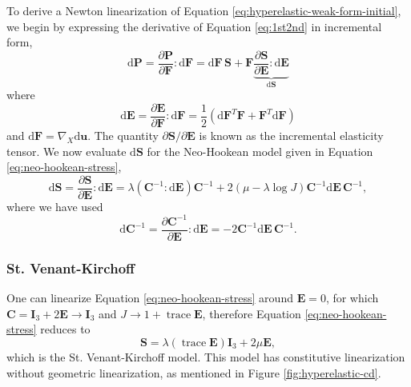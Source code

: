 To derive a Newton linearization of Equation \ref{eq:hyperelastic-weak-form-initial}, we begin by expressing the derivative of Equation \ref{eq:1st2nd} in incremental form,
\begin{equation}
   \text{d} \mathbf P = \frac{\partial \mathbf P}{\partial \mathbf F} \!:\! \text{d} \mathbf F = \text{d} \mathbf F\, \mathbf S + \mathbf F \underbrace{\frac{\partial \mathbf S}{\partial \mathbf E} \!:\! \text{d} \mathbf E}_{\text{d} \mathbf S}
   \label{eq:diff-P}
\end{equation}
where
\begin{equation}
   \text{d} \mathbf E = \frac{\partial \mathbf E}{\partial \mathbf F} \!:\! \text{d} \mathbf F = \frac 1 2 \left( \text{d} \mathbf F^T \mathbf F + \mathbf F^T \text{d} \mathbf F \right)
\end{equation}
and $\text{d}\mathbf F = \nabla_X\text{d}\mathbf u$.
The quantity ${\partial \mathbf S} / {\partial \mathbf E}$ is known as the incremental elasticity tensor.
We now evaluate $\text{d} \mathbf S$ for the Neo-Hookean model given in Equation \ref{eq:neo-hookean-stress},
\begin{equation}
   \text{d}\mathbf S = \frac{\partial \mathbf S}{\partial \mathbf E} \!:\! \text{d} \mathbf E
   = \lambda \left(\mathbf C^{-1} \!:\! \text{d}\mathbf E \right) \mathbf C^{-1}
     + 2 \left(\mu - \lambda \log J \right) \mathbf C^{-1} \text{d}\mathbf E \, \mathbf C^{-1},
   \label{eq-neo-hookean-incremental-stress}
\end{equation}
where we have used
\begin{equation}
   \text{d} \mathbf C^{-1} = \frac{\partial \mathbf C^{-1}}{\partial \mathbf E} \!:\! \text{d}\mathbf E
   = -2 \mathbf C^{-1} \text{d} \mathbf E \, \mathbf C^{-1} .
\end{equation}

\subsubsection{St. Venant-Kirchoff}

One can linearize Equation \ref{eq:neo-hookean-stress} around $\mathbf E = 0$, for which $\mathbf C = \mathbf I_3 + 2 \mathbf E \to \mathbf I_3$ and $J \to 1 + \operatorname{trace} \mathbf E$, therefore Equation \ref{eq:neo-hookean-stress} reduces to
\begin{equation}
      \mathbf S = \lambda (\operatorname{trace} \mathbf E) \mathbf I_3 + 2 \mu \mathbf E,
      \label{eq:st-venant-kirchoff}
\end{equation}
which is the St. Venant-Kirchoff model.
This model has constitutive linearization without geometric linearization, as mentioned in Figure \ref{fig:hyperelastic-cd}.

